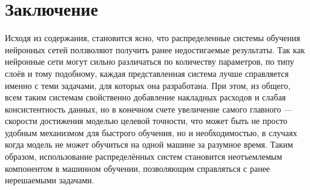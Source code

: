 
\section{Заключение}

Исходя из содержания, становится ясно, что распределенные системы обучения нейронных сетей ползволяют получить ранее недостигаемые результаты. Так как нейронные сети могут сильно различаться по количеству параметров, по типу слоёв и тому подобному, каждая представленная система лучше справляется именно с теми задачами, для которых она разработана. При этом, из общего, всем таким системам свойственно добавление накладных расходов и слабая консистентность данных, но в конечном счете увеличение самого главного — скорости достижения моделью целевой точности, что может быть не просто удобным механизмом для быстрого обучения, но и необходимостью, в случаях когда модель не может обучиться на одной машине за разумное время. Таким образом, использование распределённых систем становится неотъемлемым компонентом в машинном обучении, позволяющим справляться с ранее нерешаемыми задачами.
